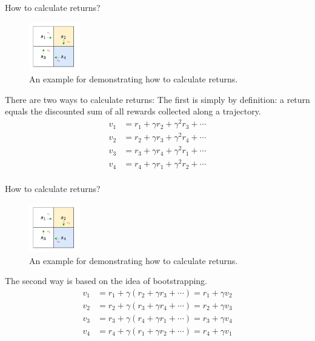 \documentclass[aspectratio=169,xcolor=dvipsnames]{beamer}
\begin{document}
\begin{frame}{How to calculate returns?}

\begin{figure}
	\centering
	\includegraphics[width=0.2\textwidth]{../imgs/chap2/ex_calculate_returns.pdf}
	\caption{An example for demonstrating how to calculate returns.}
	\label{fig:calculate_returns}
\end{figure}

There are two ways to calculate returns: The first is simply by definition: a return equals the discounted sum of all rewards collected along a trajectory.
\begin{equation*}
	\begin{aligned}
		v_1 &= r_1 + \gamma r_2 + \gamma^2 r_3 + \cdots \\
		v_2 &= r_2 + \gamma r_3 + \gamma^2 r_4 + \cdots \\
		v_3 &= r_3 + \gamma r_4 + \gamma^2 r_1 + \cdots \\
		v_4 &= r_4 + \gamma r_1 + \gamma^2 r_2 + \cdots \\
	\end{aligned}
\end{equation*}

\end{frame}


\begin{frame}{How to calculate returns?}

\begin{figure}
	\centering
	\includegraphics[width=0.2\textwidth]{../imgs/chap2/ex_calculate_returns.pdf}
	\caption{An example for demonstrating how to calculate returns.}
\end{figure}

The second way is based on the idea of bootstrapping.
\begin{equation} \label{eq:bootstrapping}
	\begin{aligned}
		v_1 &= r_1 + \gamma(r_2 + \gamma r_3 + \cdots) = r_1 + \gamma v_2 \\
		v_2 &= r_2 + \gamma(r_3 + \gamma r_4 + \cdots) = r_2 + \gamma v_3 \\
		v_3 &= r_3 + \gamma(r_4 + \gamma r_1 + \cdots) = r_3 + \gamma v_4 \\
		v_4 &= r_4 + \gamma(r_1 + \gamma r_2 + \cdots) = r_4 + \gamma v_1 \\
	\end{aligned}
\end{equation}

\end{frame}
\end{document}
